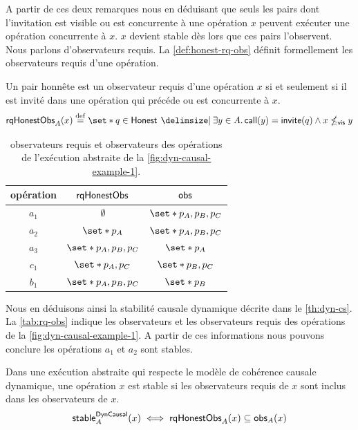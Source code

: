 A partir de ces deux remarques nous en déduisant que seuls les pairs dont l'invitation est visible ou est concurrente à une opération $x$ peuvent exécuter une opération concurrente à $x$.
$x$ devient stable dès lors que ces pairs l'observent.
Nous parlons d'observateurs requis.
La \autoref{def:honest-rq-obs} définit formellement les observateurs requis d'une opération.

\begin{definition}\label{def:honest-rq-obs}
Un pair honnête est un observateur requis d'une opération $x$ si et seulement si il est invité dans une opération qui précéde ou est concurrente à $x$.
\begin{equation*}
    \trm{rqHonestObs}_A(x) \defeq \set*{q \in \trm{Honest} \given \exists y \in A \qsep \trm{call}(y) = \trm{invite}(q) \land x \nviseq y}
\end{equation*}
\end{definition}


\begin{table}[htb]
    \centering
    \begin{tabular}{ccc}
        opération & $\operatorname{\mathsf{rqHonestObs}}$ & $\operatorname{\mathsf{obs}}$ \\
        \toprule
        $a_1$ & $\emptyset$ & $\set*{p_A, p_B, p_C}$ \\
        $a_2$ & $\set*{p_A}$ & $\set*{p_A, p_B, p_C}$ \\
        $a_3$ & $\set*{p_A, p_B, p_C}$ & $\set*{p_A}$ \\
        $c_1$ & $\set*{p_A, p_C}$ & $\set*{p_B, p_C}$\\
        $b_1$ & $\set*{p_A, p_B, p_C}$ & $\set*{p_B}$ \\
    \end{tabular}
    \caption[Observateurs requis]{observateurs requis et observateurs des opérations de l'exécution abstraite de la \autoref{fig:dyn-causal-example-1}.}\label{tab:rq-obs}
\end{table}

Nous en déduisons ainsi la stabilité causale dynamique décrite dans le \autoref{th:dyn-cs}.
La \autoref{tab:rq-obs} indique les observateurs et les observateurs requis des opérations de la \autoref{fig:dyn-causal-example-1}.
A partir de ces informations nous pouvons conclure les opérations $a_1$ et $a_2$ sont stables.

\begin{theorem}\label{th:dyn-cs}
Dans une exécution abstraite qui respecte le modèle de cohérence causale dynamique, une opération $x$ est stable si les observateurs requis de $x$ sont inclus dans les observateurs de $x$.
\begin{equation*}
    \operatorname{\mathsf{stable}}_A^{\operatorname{\mathsf{DynCausal}}}(x) \iff \operatorname{\mathsf{rqHonestObs}}_A(x) \subseteq \operatorname{\mathsf{obs}}_A(x)
\end{equation*}
\end{theorem}


